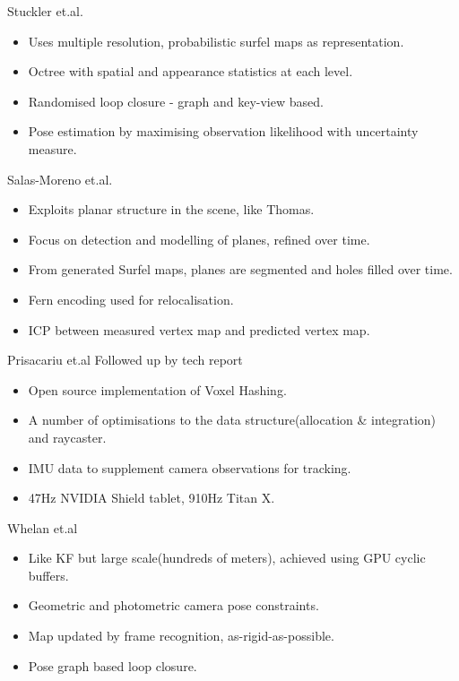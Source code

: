Stuckler et.al. \cite{Stuckler2014}
\begin{itemize}
	\item Uses multiple resolution, probabilistic surfel maps as representation. \cite{Pfister2000}
	\item Octree with spatial and appearance statistics at each level.
	\item Randomised loop closure - graph and key-view based.
	\item Pose estimation by maximising observation likelihood with uncertainty measure.
\end{itemize}

Salas-Moreno et.al. \cite{Salas-Moreno2014}
\begin{itemize}
	\item Exploits planar structure in the scene, like Thomas.
	\item Focus on detection and modelling of planes, refined over time.
	\item From generated Surfel maps, planes are segmented and holes filled over time. \cite{Pfister2000}
	\item Fern encoding used for relocalisation. %
	\item ICP between measured vertex map and predicted vertex map.
\end{itemize}

Prisacariu et.al \cite{Prisacariu2014} Followed up by tech report \cite{Kahler2015}
\begin{itemize}
	\item Open source implementation of Voxel Hashing.
	\item A number of optimisations to the data structure(allocation \& integration) and raycaster.
	\item IMU data to supplement camera observations for tracking.
	\item 47Hz NVIDIA Shield tablet, 910Hz Titan X.
\end{itemize}

Whelan et.al \cite{Whelan2015}
\begin{itemize}
	\item Like KF but large scale(hundreds of meters), achieved using GPU cyclic buffers.
	\item Geometric and photometric camera pose constraints.
	\item Map updated by frame recognition, as-rigid-as-possible. %
	\item Pose graph based loop closure.
\end{itemize}

